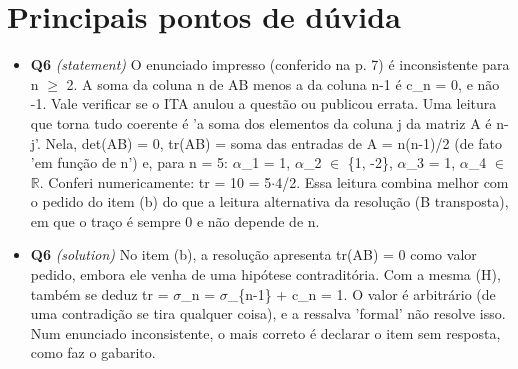 \documentclass{article}%
\begin{document}
%
\section*{Principais pontos de dúvida}%
\begin{itemize}%
\item%
\textbf{Q6} \textit{(statement)} O enunciado impresso (conferido na p. 7) é inconsistente para n $\geq$ 2. A soma da coluna n de AB menos a da coluna n-1 é c\_n = 0, e não -1. Vale verificar se o ITA anulou a questão ou publicou errata. Uma leitura que torna tudo coerente é 'a soma dos elementos da coluna j da matriz A é n-j'. Nela, det(AB) = 0, tr(AB) = soma das entradas de A = n(n-1)/2 (de fato 'em função de n') e, para n = 5: $\alpha$\_1 = 1, $\alpha$\_2 $\in$ \{1, -2\}, $\alpha$\_3 = 1, $\alpha$\_4 $\in$ $\mathbb{R}$. Conferi numericamente: tr = 10 = 5$\cdot$4/2. Essa leitura combina melhor com o pedido do item (b) do que a leitura alternativa da resolução (B transposta), em que o traço é sempre 0 e não depende de n.%
\item%
\textbf{Q6} \textit{(solution)} No item (b), a resolução apresenta tr(AB) = 0 como valor pedido, embora ele venha de uma hipótese contraditória. Com a mesma (H), também se deduz tr = $\sigma$\_n = $\sigma$\_\{n-1\} + c\_n = 1. O valor é arbitrário (de uma contradição se tira qualquer coisa), e a ressalva 'formal' não resolve isso. Num enunciado inconsistente, o mais correto é declarar o item sem resposta, como faz o gabarito.%
\end{itemize}%
\end{document}
